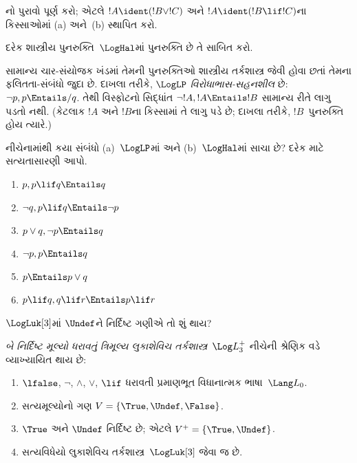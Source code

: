 \begin{prob}
  નો પુરાવો પૂર્ણ કરો; એટલે
  $!A \ident (!B \lor !C)$ અને $!A \ident (!B \lif !C)$ના
  કિસ્સાઓમાં (a) અને~(b) સ્થાપિત કરો.
\end{prob}

\begin{prob}
દરેક શાસ્ત્રીય પુનરુક્તિ~$\LogHal$માં પુનરુક્તિ છે તે સાબિત કરો.
\end{prob}

સામાન્ય ચાર-સંયોજક ખંડમાં તેમની પુનરુક્તિઓ શાસ્ત્રીય તર્કશાસ્ત્ર
જેવી હોવા છતાં તેમના ફલિતતા-સંબંધો જુદા છે. દાખલા તરીકે,
$\LogLP$ \emph{વિરોધાભાસ-સહનશીલ} છે: $\lnot p, p \Entails/ q$.
તેથી વિસ્ફોટનો સિદ્ધાંત $\lnot !A, !A \Entails !B$ સામાન્ય રીતે
લાગુ પડતો નથી. (કેટલાક $!A$ અને $!B$ના કિસ્સામાં તે લાગુ પડે છે;
દાખલા તરીકે, $!B$~પુનરુક્તિ હોય ત્યારે.)

\begin{prob}
  નીચેનામાંથી કયા સંબંધો (a)~$\LogLP$માં અને (b)~$\LogHal$માં
  સાચા છે? દરેક માટે સત્યતાસારણી આપો.
  \begin{enumerate}
    \item $p, p \lif q \Entails q$
    \item $\lnot q, p \lif q \Entails \lnot p$
    \item $p \lor q, \lnot p \Entails q$
    \item $\lnot p, p \Entails q$
    \item $p \Entails p \lor q$
    \item $p \lif q, q\lif r \Entails p \lif r$
  \end{enumerate}
\end{prob}

$\LogLuk[3]$માં $\Undef$ને નિર્દિષ્ટ ગણીએ તો શું થાય?

\begin{defn}
\emph{બે નિર્દિષ્ટ મૂલ્યો ધરાવતું ત્રિમૂલ્ય લુકાશેવિચ
તર્કશાસ્ત્ર}~$\Log L_3^{+}$ નીચેની શ્રેણિક વડે વ્યાખ્યાયિત થાય છે:
  \begin{enumerate}
    \item $\lfalse$, $\lnot$, $\land$, $\lor$, $\lif$
    ધરાવતી પ્રમાણભૂત વિધાનાત્મક ભાષા~$\Lang L_0$.
    \item સત્યમૂલ્યોનો ગણ $V = \{\True, \Undef, \False\}$.
    \item $\True$ અને $\Undef$ નિર્દિષ્ટ છે; એટલે $V^+ = \{\True, \Undef\}$.
    \item સત્યવિધેયો લુકાશેવિચ તર્કશાસ્ત્ર~$\LogLuk[3]$ જેવા જ છે.
  \end{enumerate}
\end{defn}

